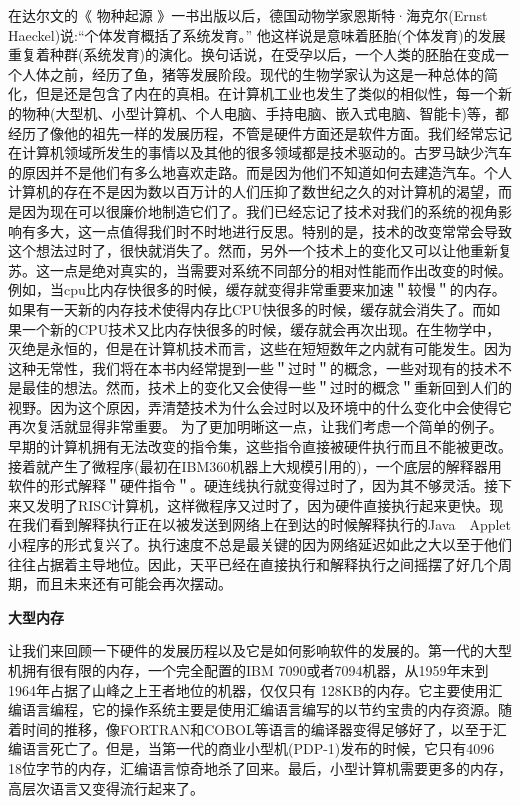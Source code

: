	在达尔文的《 物种起源 》一书出版以后，德国动物学家恩斯特·海克尔(Ernst Haeckel)说:“个体发育概括了系统发育。” 他这样说是意味着胚胎(个体发育)的发展重复着种群(系统发育)的演化。换句话说，在受孕以后，一个人类的胚胎在变成一个人体之前，经历了鱼，猪等发展阶段。现代的生物学家认为这是一种总体的简化，但是还是包含了内在的真相。在计算机工业也发生了类似的相似性，每一个新的物种(大型机、小型计算机、个人电脑、手持电脑、嵌入式电脑、智能卡)等，都经历了像他的祖先一样的发展历程，不管是硬件方面还是软件方面。我们经常忘记在计算机领域所发生的事情以及其他的很多领域都是技术驱动的。古罗马缺少汽车的原因并不是他们有多么地喜欢走路。而是因为他们不知道如何去建造汽车。个人计算机的存在不是因为数以百万计的人们压抑了数世纪之久的对计算机的渴望，而是因为现在可以很廉价地制造它们了。我们已经忘记了技术对我们的系统的视角影响有多大，这一点值得我们时不时地进行反思。特别的是，技术的改变常常会导致这个想法过时了，很快就消失了。然而，另外一个技术上的变化又可以让他重新复苏。这一点是绝对真实的，当需要对系统不同部分的相对性能而作出改变的时候。例如，当cpu比内存快很多的时候，缓存就变得非常重要来加速＂较慢＂的内存。如果有一天新的内存技术使得内存比CPU快很多的时候，缓存就会消失了。而如果一个新的CPU技术又比内存快很多的时候，缓存就会再次出现。在生物学中，灭绝是永恒的，但是在计算机技术而言，这些在短短数年之内就有可能发生。因为这种无常性，我们将在本书内经常提到一些＂过时＂的概念，一些对现有的技术不是最佳的想法。然而，技术上的变化又会使得一些＂过时的概念＂重新回到人们的视野。因为这个原因，弄清楚技术为什么会过时以及环境中的什么变化中会使得它再次复活就显得非常重要。
	为了更加明晰这一点，让我们考虑一个简单的例子。早期的计算机拥有无法改变的指令集，这些指令直接被硬件执行而且不能被更改。接着就产生了微程序(最初在IBM360机器上大规模引用的)，一个底层的解释器用软件的形式解释＂硬件指令＂。硬连线执行就变得过时了，因为其不够灵活。接下来又发明了RISC计算机，这样微程序又过时了，因为硬件直接执行起来更快。现在我们看到解释执行正在以被发送到网络上在到达的时候解释执行的Java　Applet小程序的形式复兴了。执行速度不总是最关键的因为网络延迟如此之大以至于他们往往占据着主导地位。因此，天平已经在直接执行和解释执行之间摇摆了好几个周期，而且未来还有可能会再次摆动。
	
	\textbf{大型内存}
	
	让我们来回顾一下硬件的发展历程以及它是如何影响软件的发展的。第一代的大型机拥有很有限的内存，一个完全配置的IBM 7090或者7094机器，从1959年末到1964年占据了山峰之上王者地位的机器，仅仅只有
	128KB的内存。它主要使用汇编语言编程，它的操作系统主要是使用汇编语言编写的以节约宝贵的内存资源。随着时间的推移，像FORTRAN和COBOL等语言的编译器变得足够好了，以至于汇编语言死亡了。但是，当第一代的商业小型机(PDP-1)发布的时候，它只有4096　18位字节的内存，汇编语言惊奇地杀了回来。最后，小型计算机需要更多的内存，高层次语言又变得流行起来了。
	
